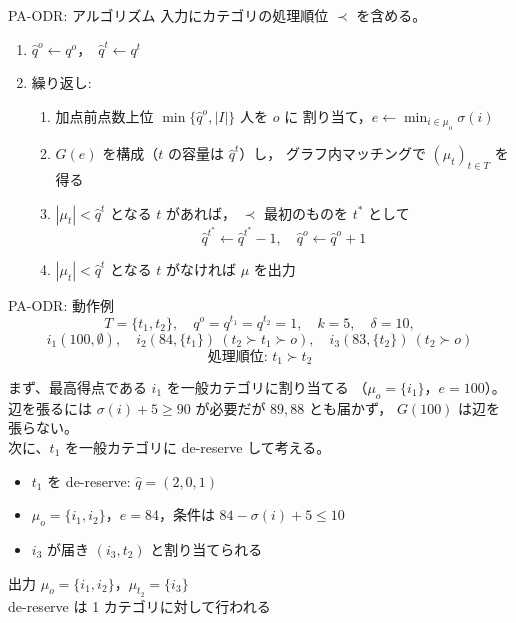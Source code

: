 \documentclass[aspectratio=43,11pt]{beamer}
\newcommand{\muc}[1]{\mu_{#1}}
\newcommand{\score}{\sigma}
\begin{document}
\begin{frame}{PA-ODR: アルゴリズム}
  入力にカテゴリの処理順位 $\prec$ を含める。
  \begin{enumerate}
    \item $\hat q^{o} \leftarrow q^{o}$，\ $\hat q^{t} \leftarrow q^{t}$
    \item 繰り返し:
      \begin{enumerate}
        \item[(a)] 加点前点数上位 $\min\{\hat q^{o}, |I|\}$ 人を $o$ に
          割り当て，$e \leftarrow \min_{i \in \muc{o}} \score(i)$
        \item[(b)] $G(e)$ を構成（$t$ の容量は $\hat q^{t}$）し，
          グラフ内マッチングで $(\muc{t})_{t \in T}$ を得る
        \item[(c)] $|\muc{t}| < \hat q^{t}$ となる $t$ があれば，
          $\prec$ 最初のものを $t^{*}$ として
          \[
            \hat q^{t^{*}} \leftarrow \hat q^{t^{*}} - 1,\quad
            \hat q^{o} \leftarrow \hat q^{o} + 1
          \]
        \item[(d)] $|\muc{t}| < \hat q^{t}$ となる $t$ がなければ $\mu$ を出力
      \end{enumerate}
  \end{enumerate}
\end{frame}

\begin{frame}{PA-ODR: 動作例}
  \[
    T = \{t_1, t_2\}, \quad q^{o} = q^{t_1} = q^{t_2} = 1, \quad
    k = 5, \quad \delta = 10,
  \]
  \[
    i_1(100, \emptyset), \quad
    i_2(84, \{t_1\})\ (t_2 \succ t_1 \succ o), \quad
    i_3(83, \{t_2\})\ (t_2 \succ o)
  \]
  \[
    \text{処理順位: } t_1 \succ t_2
  \]

  まず、最高得点である $i_1$ を一般カテゴリに割り当てる
  （$\muc{o} = \{i_1\}$，$e = 100$）。\\
  辺を張るには $\score(i) + 5 \ge 90$ が必要だが $89, 88$ とも届かず，
  $G(100)$ は辺を張らない。\\
  次に、$t_1$ を一般カテゴリに de-reserve して考える。

  \begin{itemize}
    \item $t_1$ を de-reserve: $\hat q = (2, 0, 1)$
    \item $\muc{o} = \{i_1, i_2\}$，$e = 84$，条件は
      $84 - \score(i) + 5 \le 10$
    \item $i_3$ が届き $(i_3, t_2)$ と割り当てられる
  \end{itemize}

  出力 $\muc{o} = \{i_1, i_2\}$，$\muc{t_2} = \{i_3\}$\\
  de-reserve は 1 カテゴリに対して行われる
\end{frame}
\end{document}
